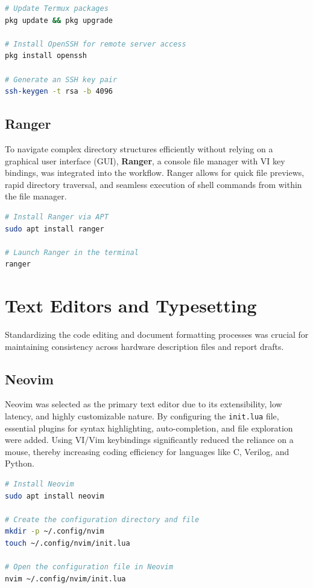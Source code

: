 \documentclass[12pt, a4paper]{report}
\begin{document}
\begin{lstlisting}[language=bash, caption=Termux Setup and SSH Configuration]
# Update Termux packages
pkg update && pkg upgrade

# Install OpenSSH for remote server access
pkg install openssh

# Generate an SSH key pair
ssh-keygen -t rsa -b 4096
\end{lstlisting}

\subsection{Ranger}
To navigate complex directory structures efficiently without relying on a graphical user interface (GUI), \textbf{Ranger}, a console file manager with VI key bindings, was integrated into the workflow. Ranger allows for quick file previews, rapid directory traversal, and seamless execution of shell commands from within the file manager.

\begin{lstlisting}[language=bash, caption=Installing and Launching Ranger]
# Install Ranger via APT
sudo apt install ranger

# Launch Ranger in the terminal
ranger
\end{lstlisting}

\section{Text Editors and Typesetting}
Standardizing the code editing and document formatting processes was crucial for maintaining consistency across hardware description files and report drafts.

\subsection{Neovim}
Neovim was selected as the primary text editor due to its extensibility, low latency, and highly customizable nature. By configuring the \texttt{init.lua} file, essential plugins for syntax highlighting, auto-completion, and file exploration were added. Using VI/Vim keybindings significantly reduced the reliance on a mouse, thereby increasing coding efficiency for languages like C, Verilog, and Python.

\begin{lstlisting}[language=bash, caption=Neovim Installation and Configuration Setup]
# Install Neovim
sudo apt install neovim

# Create the configuration directory and file
mkdir -p ~/.config/nvim
touch ~/.config/nvim/init.lua

# Open the configuration file in Neovim
nvim ~/.config/nvim/init.lua
\end{lstlisting}
\end{document}
